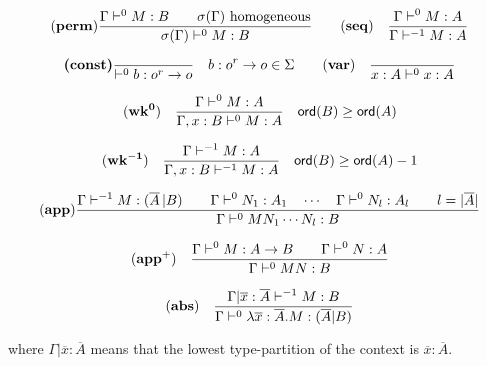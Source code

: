 \begin{table}[htbp]
$$  (\mbox{\textbf{perm}}) {
      { \Gamma \vdash^0 M:B \qquad \sigma(\Gamma)  } \hbox{ homogeneous}
    \over
      { \sigma(\Gamma) \vdash^0 M : B }
    }
\qquad
\mathbf{(seq)} \quad \frac{\displaystyle \Gamma \vdash^{0} M : A}{\Gamma \vdash^{-1} M : A}
$$

$$
 \textbf{(const)}
    { \over { \vdash^0 b : o^r \rightarrow o}} \quad b : o^r \rightarrow o \in \Sigma
\qquad
 \mathbf{(var)} \quad  \frac{\displaystyle }{x : A\vdash^{0} x : A} $$

$$ \mathbf{(wk^{0})} \quad  \frac{\displaystyle \Gamma \vdash^{0} M : A}{\Gamma , x : B \vdash^{0} M : A} \quad {\sf ord}(B) \geq {\sf ord}(A) $$

$$ \mathbf{(wk^{-1})} \quad  \frac{\displaystyle \Gamma \vdash^{-1} M : A}{\Gamma , x : B \vdash^{-1} M : A} \quad {\sf ord}(B) \geq {\sf ord}(A) -1$$


$$ (\mbox{\textbf{app}})
    \frac{\displaystyle    \Gamma \vdash^{-1} M : (\overline{A} \, | B)
            \qquad
            \Gamma \vdash^0 N_1 : A_1 \quad \cdots \quad \Gamma \vdash^0 N_{l} : A_l \qquad l = |\overline{A}|
        }{
            \Gamma \vdash^0 M N_1 \cdots N_{l} : B
        }
$$

$$ \mathbf{(app^+)} \quad  \frac{\displaystyle \Gamma \vdash^0 M : A\rightarrow B
                                        \qquad \Gamma \vdash^{0} N : A
                                   }{\Gamma  \vdash^{0} M N : B}$$

$$ \mathbf{(abs)} \quad  \frac{\displaystyle \Gamma| \overline{x} : \overline{A} \vdash^{-1} M : B}{\Gamma  \vdash^{0} \lambda \overline{x} : \overline{A} . M : (\overline{A}|B)}$$


where $\Gamma| \overline{x} : \overline{A}$ means that the lowest type-partition of the context is
$\overline{x} : \overline{A}$.
\caption{Rules of the homogeneous safe lambda calculus}
\label{tab:homosafelmd_rules_refined}
\end{table}
